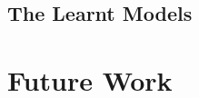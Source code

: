 \subsection{The Learnt Models} \label{subs_casestudyresults}


\section{Future Work} \label{sec_futurework}

